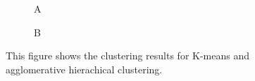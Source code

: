 \begin{figure}[!htbp] %
  \centering %

  \begin{subfigure}{0.48\textwidth} %
    \centering
    \fbox{\rule[-.5cm]{0cm}{3cm} \rule[-.5cm]{3cm}{0cm}} %
    \caption{A} %
    \label{fig:subA_1x2} %
  \end{subfigure}\hfill %
  \begin{subfigure}{0.48\textwidth} %
    \centering
    \fbox{\rule[-.5cm]{0cm}{3cm} \rule[-.5cm]{3cm}{0cm}} %
    \caption{B} %
    \label{fig:subB_1x2} %
  \end{subfigure}

  \caption{This figure shows the clustering results for K-means and agglomerative hierachical clustering.} %
  \label{fig:main_figure_1x2_grid} %
\end{figure}